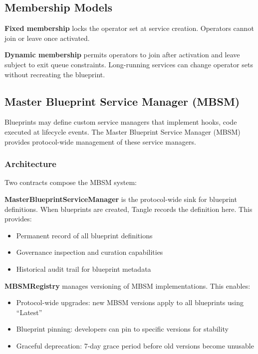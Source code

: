 \documentclass[11pt,a4paper]{article}
\begin{document}
\subsection{Membership Models}

\textbf{Fixed membership} locks the operator set at service creation. Operators cannot join or leave once activated.

\textbf{Dynamic membership} permits operators to join after activation and leave subject to exit queue constraints. Long-running services can change operator sets without recreating the blueprint.

\subsection{Master Blueprint Service Manager (MBSM)}

Blueprints may define custom service managers that implement hooks, code executed at lifecycle events. The Master Blueprint Service Manager (MBSM) provides protocol-wide management of these service managers.

\subsubsection{Architecture}

Two contracts compose the MBSM system:

\textbf{MasterBlueprintServiceManager} is the protocol-wide sink for blueprint definitions. When blueprints are created, Tangle records the definition here. This provides:
\begin{itemize}[noitemsep]
    \item Permanent record of all blueprint definitions
    \item Governance inspection and curation capabilities
    \item Historical audit trail for blueprint metadata
\end{itemize}

\textbf{MBSMRegistry} manages versioning of MBSM implementations. This enables:
\begin{itemize}[noitemsep]
    \item Protocol-wide upgrades: new MBSM versions apply to all blueprints using ``Latest''
    \item Blueprint pinning: developers can pin to specific versions for stability
    \item Graceful deprecation: 7-day grace period before old versions become unusable
\end{itemize}
\end{document}
